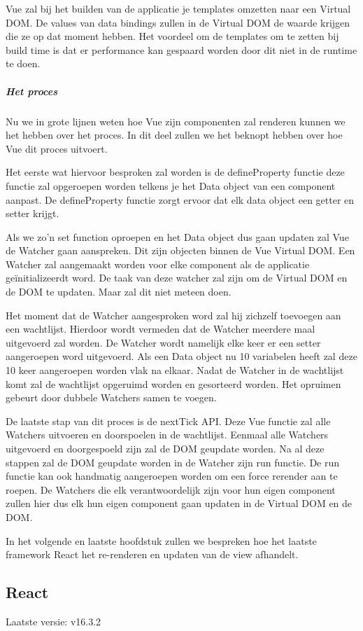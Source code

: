 Vue zal bij het builden van de applicatie je templates omzetten naar een Virtual DOM. De values van data bindings zullen in de Virtual DOM de waarde krijgen die ze op dat moment hebben. Het voordeel om de templates om te zetten bij build time is dat er performance kan gespaard worden door dit niet in de runtime te doen.

\subparagraph{Het proces}
Nu we in grote lijnen weten hoe Vue zijn componenten zal renderen kunnen we het hebben over het proces. In dit deel zullen we het beknopt hebben over hoe Vue dit proces uitvoert.

Het eerste wat hiervoor besproken zal worden is de defineProperty functie deze functie zal opgeroepen worden telkens je het Data object van een component aanpast. De defineProperty functie zorgt ervoor dat elk data object een getter en setter krijgt.

Als we zo’n set function oproepen en het Data object dus gaan updaten zal Vue de Watcher gaan aanspreken. Dit zijn objecten binnen de Vue Virtual DOM. Een Watcher zal aangemaakt worden voor elke component als de applicatie geïnitializeerdt word. De taak van deze watcher zal zijn om de Virtual DOM en de DOM te updaten. Maar zal dit niet meteen doen.

Het moment dat de Watcher aangesproken word zal hij zichzelf toevoegen aan een wachtlijst. Hierdoor wordt vermeden dat de Watcher meerdere maal uitgevoerd zal worden. De Watcher wordt namelijk elke keer er een setter aangeroepen word uitgevoerd. Als een Data object nu 10 variabelen heeft zal deze 10 keer aangeroepen worden vlak na elkaar. Nadat de Watcher in de wachtlijst komt zal de wachtlijst opgeruimd worden en gesorteerd worden. Het opruimen gebeurt door dubbele Watchers samen te voegen.

De laatste stap van dit proces is de nextTick API. Deze Vue functie zal alle Watchers uitvoeren en doorspoelen in de wachtlijst. Eenmaal alle Watchers uitgevoerd en doorgespoeld zijn zal de DOM geupdate worden. Na al deze stappen zal de DOM geupdate worden in de Watcher zijn run functie. De run functie kan ook handmatig aangeroepen worden om een force rerender aan te roepen. De Watchers die elk verantwoordelijk zijn voor hun eigen component zullen hier dus elk hun eigen component gaan updaten in de Virtual DOM en de DOM.

In het volgende en laatste hoofdstuk zullen we bespreken hoe het laatste framework React het re-renderen en updaten van de view afhandelt.


\subsection{React}
\label{sec:JavaScript_Frameworks_React}
Laatste versie: v16.3.2

